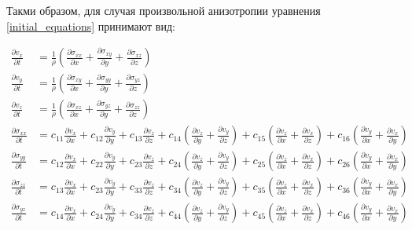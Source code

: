 Такми образом, для случая произвольной анизотропии уравнения \eqref{initial_equations} принимают вид:
\begin{small}
\begin{align}
	\label{anisotropic_equations}
	\frac{\partial{v_x}}{\partial{t}}&=\frac{1}{\rho}(\frac{\partial{\sigma_{xx}}}{\partial{x}}+\frac{\partial{\sigma_{xy}}}{\partial{y}}+\frac{\partial{\sigma_{xz}}}{\partial{z}})
	\nonumber\\
	\frac{\partial{v_y}}{\partial{t}}&=\frac{1}{\rho}(\frac{\partial{\sigma_{xy}}}{\partial{x}}+\frac{\partial{\sigma_{yy}}}{\partial{y}}+\frac{\partial{\sigma_{yz}}}{\partial{z}})
	\nonumber\\
	\frac{\partial{v_z}}{\partial{t}}&=\frac{1}{\rho}(\frac{\partial{\sigma_{xz}}}{\partial{x}}+\frac{\partial{\sigma_{yz}}}{\partial{y}}+\frac{\partial{\sigma_{zz}}}{\partial{z}})
	\nonumber\\
	\frac{\partial{\sigma_{xx}}}{\partial{t}}&=c_{11}\frac{\partial{v_x}}{\partial{x}}+c_{12}\frac{\partial{v_y}}{\partial{y}}+c_{13}\frac{\partial{v_z}}{\partial{z}}+c_{14}(\frac{\partial{v_z}}{\partial{y}}+\frac{\partial{v_y}}{\partial{z}})+c_{15}(\frac{\partial{v_z}}{\partial{x}}+\frac{\partial{v_x}}{\partial{z}})+c_{16}(\frac{\partial{v_y}}{\partial{x}}+\frac{\partial{v_x}}{\partial{y}})
	\nonumber\\
	\frac{\partial{\sigma_{yy}}}{\partial{t}}&=c_{12}\frac{\partial{v_x}}{\partial{x}}+c_{22}\frac{\partial{v_y}}{\partial{y}}+c_{23}\frac{\partial{v_z}}{\partial{z}}+c_{24}(\frac{\partial{v_z}}{\partial{y}}+\frac{\partial{v_y}}{\partial{z}})+c_{25}(\frac{\partial{v_z}}{\partial{x}}+\frac{\partial{v_x}}{\partial{z}})+c_{26}(\frac{\partial{v_y}}{\partial{x}}+\frac{\partial{v_x}}{\partial{y}})
	\nonumber\\
	\frac{\partial{\sigma_{zz}}}{\partial{t}}&=c_{13}\frac{\partial{v_x}}{\partial{x}}+c_{23}\frac{\partial{v_y}}{\partial{y}}+c_{33}\frac{\partial{v_z}}{\partial{z}}+c_{34}(\frac{\partial{v_z}}{\partial{y}}+\frac{\partial{v_y}}{\partial{z}})+c_{35}(\frac{\partial{v_z}}{\partial{x}}+\frac{\partial{v_x}}{\partial{z}})+c_{36}(\frac{\partial{v_y}}{\partial{x}}+\frac{\partial{v_x}}{\partial{y}})
	\nonumber\\
	\frac{\partial{\sigma_{yz}}}{\partial{t}}&=c_{14}\frac{\partial{v_x}}{\partial{x}}+c_{24}\frac{\partial{v_y}}{\partial{y}}+c_{34}\frac{\partial{v_z}}{\partial{z}}+c_{44}(\frac{\partial{v_z}}{\partial{y}}+\frac{\partial{v_y}}{\partial{z}})+c_{45}(\frac{\partial{v_z}}{\partial{x}}+\frac{\partial{v_x}}{\partial{z}})+c_{46}(\frac{\partial{v_y}}{\partial{x}}+\frac{\partial{v_x}}{\partial{y}})

\end{align}
\end{small}
